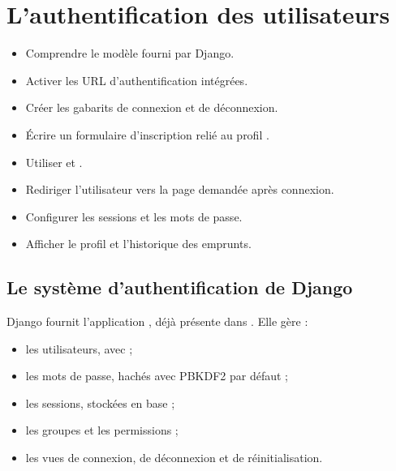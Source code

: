 \chapter{L'authentification des utilisateurs}
\label{ch:authentification}


\begin{objectifs}
\begin{itemize}
  \item Comprendre le modèle  fourni par Django.
  \item Activer les URL d'authentification intégrées.
  \item Créer les gabarits de connexion et de déconnexion.
  \item Écrire un formulaire d'inscription relié au profil .
  \item Utiliser  et .
  \item Rediriger l'utilisateur vers la page demandée après connexion.
  \item Configurer les sessions et les mots de passe.
  \item Afficher le profil et l'historique des emprunts.
\end{itemize}
\end{objectifs}

\section{Le système d'authentification de Django}

Django fournit l'application , déjà présente dans
. Elle gère :
\begin{itemize}
  \item les utilisateurs, avec  ;
  \item les mots de passe, hachés avec PBKDF2 par défaut ;
  \item les sessions, stockées en base ;
  \item les groupes et les permissions ;
  \item les vues de connexion, de déconnexion et de réinitialisation.
\end{itemize}

